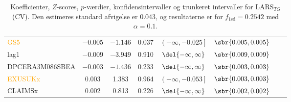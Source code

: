 \begin{table}[ht]
{\begin{tabular}{lccccccc}
\textcolor{orange}{GS5} & $-0.005$ & $-1.146 $ &0.037 &     $\left( -\infty ,  -0.025\right]   $ & $\sbr{0.005 ,0.005 }$\\  
 \textcolor{blue3}{lag1}  & $-0.009$  &$-3.949$   & 0.910   & $\del{-\infty  ,  \infty }$  &$\sbr{0.009, 0.009 }$ \\ 
 \textcolor{red3}{DPCERA3M086SBEA} & $- 0.003$ & $-1.436$ & 0.233  &   $\del{-\infty   ,  \infty }$ &  $\sbr{0.003, 0.003}$ \\ 
\textcolor{orange}{ EXUSUKx}  &  0.003   &1.383 & 0.964   &   $\left( -\infty     ,-0.053 \right] $&  $\sbr{0.003, 0.003 }$   \\   
 \textcolor{blue3}{CLAIMSx} &0.002 &  0.813   & 0.226 &    $\del{-\infty  ,  \infty}$& $\sbr{0.002 ,0.002 }$   \\ 
\bottomrule
\end{tabular}  
}
\caption{Koefficienter, \(Z\)-scores, \(p\)-værdier, konfidensintervaller og trunkeret intervaller for LARS$_{TG}$ (CV). Den estimeres standard afvigelse er \(0.043\), og resultaterne er for \(f_{1 \text{sd}} = 0.2542\) med \(\alpha = 0.1\).} \label{tab:larInf_kryds}
\end{table} 
